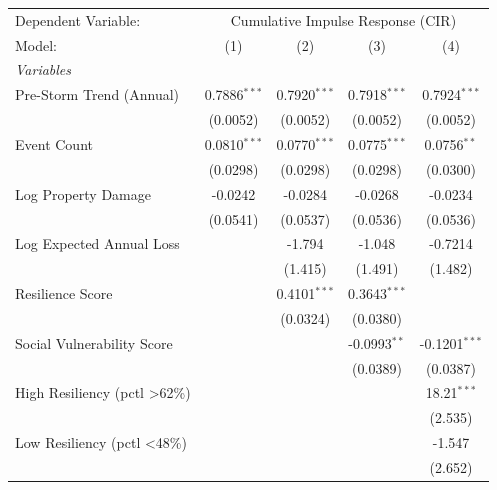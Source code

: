 
\begingroup
\centering
\begin{tabular}{lcccc}
   \tabularnewline \midrule \midrule
   Dependent Variable: & \multicolumn{4}{c}{Cumulative Impulse Response (CIR)}\\
   Model:                        & (1)            & (2)            & (3)            & (4)\\  
   \midrule
   \emph{Variables}\\
   Pre-Storm Trend (Annual)      & 0.7886$^{***}$ & 0.7920$^{***}$ & 0.7918$^{***}$ & 0.7924$^{***}$\\   
                                 & (0.0052)       & (0.0052)       & (0.0052)       & (0.0052)\\   
   Event Count                   & 0.0810$^{***}$ & 0.0770$^{***}$ & 0.0775$^{***}$ & 0.0756$^{**}$\\   
                                 & (0.0298)       & (0.0298)       & (0.0298)       & (0.0300)\\   
   Log Property Damage           & -0.0242        & -0.0284        & -0.0268        & -0.0234\\   
                                 & (0.0541)       & (0.0537)       & (0.0536)       & (0.0536)\\   
   Log Expected Annual Loss      &                & -1.794         & -1.048         & -0.7214\\   
                                 &                & (1.415)        & (1.491)        & (1.482)\\   
   Resilience Score              &                & 0.4101$^{***}$ & 0.3643$^{***}$ &   \\   
                                 &                & (0.0324)       & (0.0380)       &   \\   
   Social Vulnerability Score    &                &                & -0.0993$^{**}$ & -0.1201$^{***}$\\   
                                 &                &                & (0.0389)       & (0.0387)\\   
   High Resiliency (pctl >62\%)  &                &                &                & 18.21$^{***}$\\   
                                 &                &                &                & (2.535)\\   
   Low Resiliency (pctl <48\%)   &                &                &                & -1.547\\   
                                 &                &                &                & (2.652)\\   

\end{tabular}
